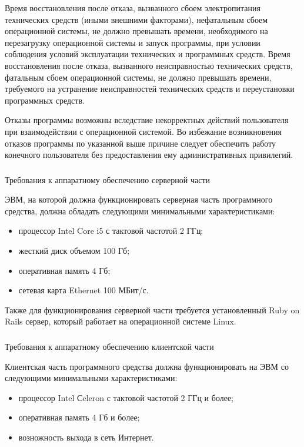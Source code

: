 Время восстановления после отказа, вызванного сбоем электропитания технических средств (иными внешними факторами),
нефатальным сбоем операционной системы, не должно превышать времени, необходимого на перезагрузку операционной системы
и запуск программы, при условии соблюдения условий эксплуатации технических и программных средств. Время восстановления
после отказа, вызванного неисправностью технических средств, фатальным сбоем операционной системы, не должно
превышать времени, требуемого на устранение неисправностей технических средств и переустановки программных средств.

Отказы программы возможны вследствие некорректных действий пользователя при взаимодействии с операционной системой.
Во избежание возникновения отказов программы по указанной выше причине следует обеспечить работу конечного
пользователя без предоставления ему административных привилегий.

\subsubsection{} Требования к аппаратному обеспечению серверной части
\label{sec:analysis:specification:server_requirments}

ЭВМ, на которой должна функционировать серверная часть программного средства, должна обладать следующими
минимальными характеристиками:

\begin{itemize}
	\item процессор Intel Core i5 с тактовой частотой 2 ГГц;
	\item жесткий диск объемом 100 Гб;
	\item оперативная память 4 Гб;
	\item сетевая карта Ethernet 100 МБит/с.
\end{itemize}

Также для функционирования серверной части требуется установленный Ruby on Rails сервер, который работает на
операционной системе Linux.

\subsubsection{} Требования к аппаратному обеспечению клиентской части
\label{sec:analysis:specification:client_requirments}

Клиентская часть программного средства должна функционировать на ЭВМ со следующими минимальными характеристиками:

\begin{itemize}
	\item процессор Intel Сeleron с тактовой частотой 2 ГГц и более;
	\item оперативная память 4 Гб и более;
	\item возножность выхода в сеть Интернет.
\end{itemize}

